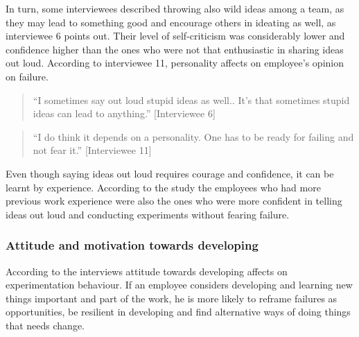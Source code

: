 In turn, some interviewees described throwing also wild ideas among a team, as they may lead to something good and encourage others in ideating as well, as interviewee 6 points out. Their level of self-criticism was considerably lower and confidence higher than the ones who were not that enthusiastic in sharing ideas out loud. According to interviewee 11, personality affects on employee's opinion on failure. 
\begin{quote}
 ``I sometimes say out loud stupid ideas as well.. It's that sometimes stupid ideas can lead to anything.'' [Interviewee 6]
\end{quote}
\begin{quote}
``I do think it depends on a personality. One has to be ready for failing and not fear it.'' [Interviewee 11]
\end{quote}
Even though saying ideas out loud requires courage and confidence, it can be learnt by experience. According to the study the employees who had more previous work experience were also the ones who were more confident in telling ideas out loud and conducting experiments without fearing failure.

\subsubsection{Attitude and motivation towards developing}
According to the interviews attitude towards developing affects on experimentation behaviour. If an employee considers developing and learning new things important and part of the work, he is more likely to reframe failures as opportunities, be resilient in developing and find alternative ways of doing things that needs change. 

